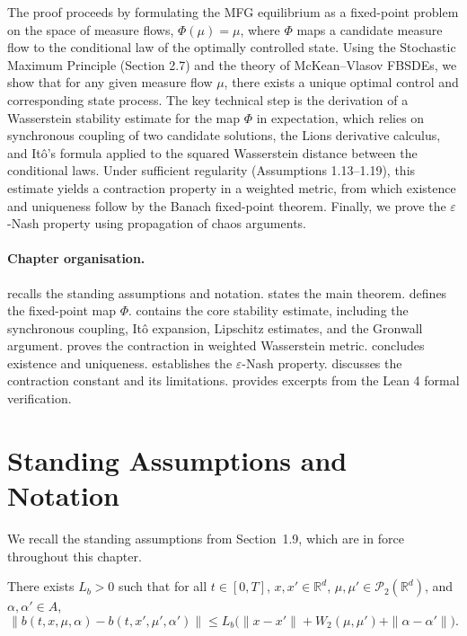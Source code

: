 The proof proceeds by formulating the MFG equilibrium as a fixed-point problem on the
space of measure flows, $\Phi(\mu) = \mu$, where $\Phi$ maps a candidate measure flow to
the conditional law of the optimally controlled state. Using the Stochastic Maximum
Principle (Section 2.7) and the theory of McKean--Vlasov FBSDEs, we show that for any
given measure flow $\mu$, there exists a unique optimal control and corresponding state
process. The key technical step is the derivation of a Wasserstein stability estimate
for the map $\Phi$ in expectation, which relies on synchronous coupling of two candidate
solutions, the Lions derivative calculus, and It\^o's formula applied to the squared
Wasserstein distance between the conditional laws. Under sufficient regularity
(Assumptions 1.13--1.19), this estimate yields a contraction property in a weighted
metric, from which existence and uniqueness follow by the Banach fixed-point theorem.
Finally, we prove the $\varepsilon$-Nash property using propagation of chaos arguments.

\paragraph{Chapter organisation.}  recalls the standing
assumptions and notation.  states the main theorem.
 defines the fixed-point map $\Phi$. 
contains the core stability estimate, including the synchronous coupling, It\^o
expansion, Lipschitz estimates, and the Gronwall argument. 
proves the contraction in weighted Wasserstein metric. 
concludes existence and uniqueness.  establishes the
$\varepsilon$-Nash property.  discusses the contraction
constant and its limitations.  provides excerpts from the Lean 4
formal verification.


\section{Standing Assumptions and Notation}
\label{sec:wp-assumptions}

We recall the standing assumptions from Section~1.9, which are in force throughout this
chapter.

\begin{assumption}
\label{ass:wp-lipschitz-drift}
There exists $L_b > 0$ such that for all $t \in [0,T]$, $x, x' \in \mathbb{R}^d$,
$\mu, \mu' \in \mathcal{P}_2(\mathbb{R}^d)$, and $\alpha, \alpha' \in A$,
\[
    \|b(t,x,\mu,\alpha) - b(t,x',\mu',\alpha')\| \leq L_b\big(\|x-x'\| + W_2(\mu,\mu') +
    \|\alpha - \alpha'\|\big).
\]
\end{assumption}

